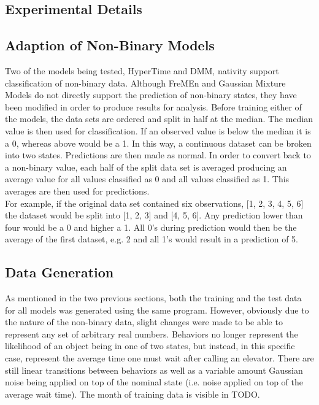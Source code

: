   \subsection{ Experimental Details }

  \subsection{ Adaption of Non-Binary Models }

  Two of the models being tested, HyperTime and DMM, nativity support
  classification of non-binary data. Although FreMEn and Gaussian Mixture Models
  do not directly support the prediction of non-binary states, they have been
  modified in order to produce results for analysis. Before training either of
  the models, the data sets are ordered and split in half at the median. The
  median value is then used for classification. If an observed value is below
  the median it is a 0, whereas above would be a 1. In this way, a continuous
  dataset can be broken into two states. Predictions are then made as normal.
  In order to convert back to a non-binary value, each half of the split data
  set is averaged producing an average value for all values classified as 0 and
  all values classified as 1. This averages are then used for predictions. \\

  For example, if the original data set contained six observations,
  [1, 2, 3, 4, 5, 6] the dataset would be split into [1, 2, 3] and [4, 5, 6].
  Any prediction lower than four would be a 0 and higher a 1. All 0's during
  prediction would then be the average of the first dataset, e.g. 2 and all
  1's would result in a prediction of 5.

  \subsection{ Data Generation }

  As mentioned in the two previous sections, both the training and the test
  data for all models was generated using the same program. However, obviously
  due to the nature of the non-binary data, slight changes were made to be able
  to represent any set of arbitrary real numbers. Behaviors no longer represent
  the likelihood of an object being in one of two states, but instead, in this
  specific case, represent the average time one must wait after calling an
  elevator. There are still linear transitions between behaviors as well as
  a variable amount Gaussian noise being applied on top of the nominal state
  (i.e. noise applied on top of the average wait time). The month of training
  data is visible in TODO. \\


